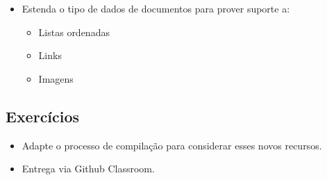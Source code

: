 \documentclass[11pt]{article}
\begin{document}
\begin{itemize}
\item Estenda o tipo de dados de documentos para prover suporte a:
\begin{itemize}
\item Listas ordenadas
\item Links
\item Imagens
\end{itemize}
\end{itemize}
\subsection*{Exercícios}
\label{sec:orgf7b2626}

\begin{itemize}
\item Adapte o processo de compilação para considerar esses novos recursos.

\item Entrega via Github Classroom.
\end{itemize}
\end{document}
